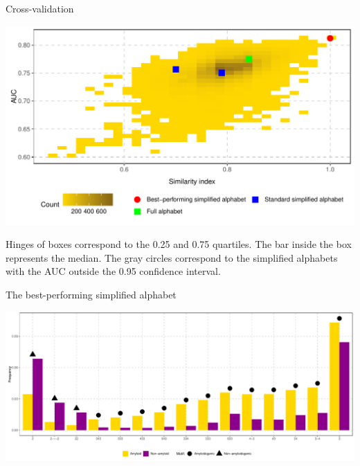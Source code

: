 \documentclass{beamer}\usepackage[]{graphicx}\usepackage[]{color}
\makeatletter
\def\maxwidth{ %
  \ifdim\Gin@nat@width>\linewidth
    \linewidth
  \else
    \Gin@nat@width
  \fi
}
\newenvironment{knitrout}{}{} %
\makeatother
\begin{document}
\begin{frame}{Cross-validation}
\begin{knitrout}
\color{fgcolor}

{\centering \includegraphics[width=\maxwidth]{figure/unnamed-chunk-12-1} 

}



\end{knitrout}
  \small
Hinges of boxes correspond to 
the 0.25 and 0.75 quartiles. The bar inside the box represents the median. The 
gray circles correspond to the simplified alphabets with the AUC outside the 0.95 
confidence interval.

  
  \end{frame}


  
    \begin{frame}{The best-performing simplified alphabet}
\begin{knitrout}
\color{fgcolor}

{\centering \includegraphics[width=\maxwidth]{figure/unnamed-chunk-13-1} 

}



\end{knitrout}
  \end{frame}
\end{document}
